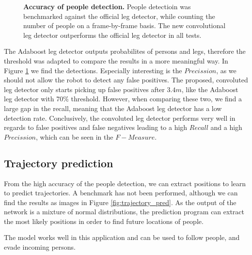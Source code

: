 \begin{figure}
	\normalsize
	\begin{center}
		
	\end{center}
	\caption{\textbf{Accuracy of people detection.} People detectioin was benchmarked against the official leg detector, while counting the number of people on a frame-by-frame basis. The new convolutional leg detector outperforms the official leg detector in all tests.}
	\label{fig:people_detection}
\end{figure}

The Adaboost leg detector outputs probabilites of persons and legs, therefore the threshold was adapted to compare the results in a more meaningful way. In Figure \ref{fig:people_detection} we find the detections. Especially interesting is the $Precission$, as we should not allow the robot to detect any false positives. The proposed, convoluted leg detector only starts picking up false positives after $3.4 m$, like the Adaboost leg detector with 70\% threshold. However, when comparing these two, we find a large gap in the recall, meaning that the Adaboost leg detector has a low detection rate.
Conclusively, the convoluted leg detector performs very well in regards to false positives and false negatives leading to a high $Recall$ and a high $Precission$, which can be seen in the $F-Measure$.


\subsection{Trajectory prediction}

From the high accuracy of the people detection, we can extract positions to learn to predict trajectories. A benchmark has not been performed, although we can find the results as images in Figure \ref{fig:trajectory_pred}. As the output of the network is a mixture of normal distributions, the prediction program can extract the most likely positions in order to find future locations of people.

The model works well in this application and can be used to follow people, and evade incoming persons. 
